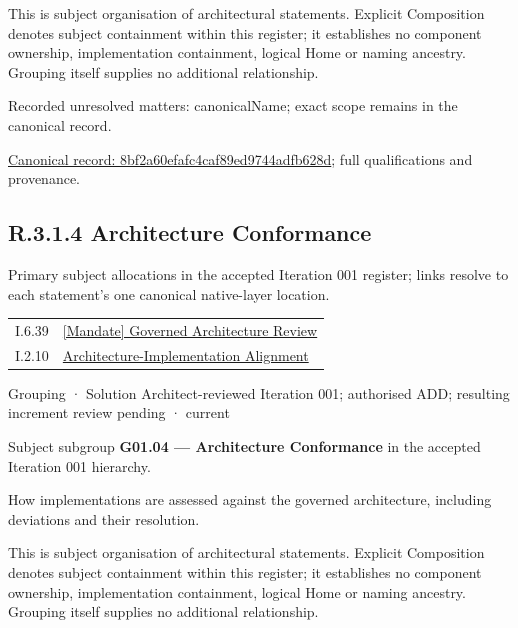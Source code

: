 This is subject organisation of architectural statements. Explicit Composition denotes subject containment within this register; it establishes no component ownership, implementation containment, logical Home or naming ancestry. Grouping itself supplies no additional relationship.


{\small Recorded unresolved matters: canonicalName; exact scope remains in the canonical record.}\par
{\footnotesize \href{../../../../continuum/grouping/8bf2a60efafc4caf89ed9744adfb628d.md}{Canonical record: 8bf2a60efafc4caf89ed9744adfb628d}; full qualifications and provenance.}\par
\subsection*{R.3.1.4 Architecture Conformance}
\label{navigation:R.3.1.4}

Primary subject allocations in the accepted Iteration 001 register; links resolve to each statement’s one canonical native-layer location.\par
\begin{longtable}{p{.22\linewidth}p{.73\linewidth}}
I.6.39 & \hyperref[element:d30a62f256ae44599841362118a84ec8]{[Mandate] Governed Architecture Review} \\
I.2.10 & \hyperref[element:adf5bd2a409b44099253fbed486d736f]{Architecture-Implementation Alignment} \\
\end{longtable}
\label{element:5989495f1e224d5797054a8b6c0364a1}
{\small Grouping · Solution Architect-reviewed Iteration 001; authorised ADD; resulting increment review pending · current}\par

Subject subgroup \textbf{G01.04 — Architecture Conformance} in the accepted Iteration 001 hierarchy.



How implementations are assessed against the governed architecture, including deviations and their resolution.



This is subject organisation of architectural statements. Explicit Composition denotes subject containment within this register; it establishes no component ownership, implementation containment, logical Home or naming ancestry. Grouping itself supplies no additional relationship.



